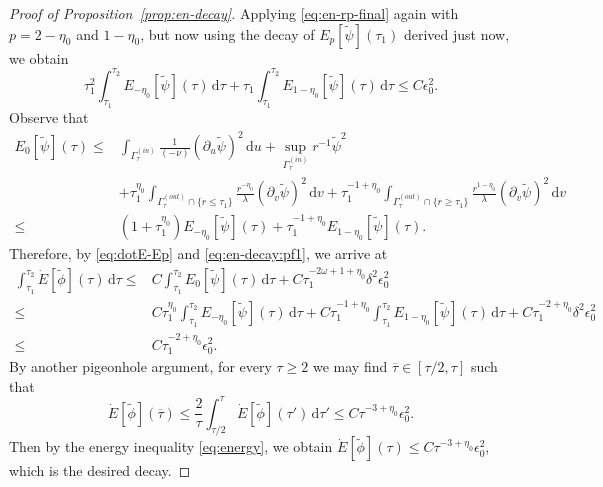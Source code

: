 \documentclass[10pt, reqno]{amsart}
\theoremstyle{definition}
\theoremstyle{remark}
\theoremstyle{conjecture}
\numberwithin{equation}{section}
\newcommand{\set}[1]{\{#1\}}
\newcommand{\ud}{\mathrm{d}}
\newcommand{\rd}{\partial}
\newcommand{\0}{\emptyset}
\newcommand{\Gmm}{\Gamma}
\newcommand{\dlt}{\delta}
\newcommand{\eps}{\epsilon}
\newcommand{\lmb}{\lambda}
\newcommand{\omg}{\omega}
\newcommand{\dur}{\nu}
\newcommand{\dvr}{\lmb}
\newcommand{\phibg}{\overline{\phi}}				%
\newcommand{\psibg}{\overline{\psi}}				%
\newcommand{\phidf}{\widetilde{\phi}}				%
\newcommand{\psidf}{\widetilde{\psi}}				%
\begin{document}
\begin{proof}[Proof of Proposition~\ref{prop:en-decay}]
Applying \eqref{eq:en-rp-final} again with $p = 2-\eta_{0}$ and $1-\eta_{0}$, but now using the decay of $E_{p}[\psidf](\tau_{1})$ derived just now, we obtain
\begin{equation} \label{eq:en-decay:pf1}
	\tau_{1}^{2} \int_{\tau_{1}}^{\tau_{2}} E_{-\eta_{0}}[\psidf](\tau) \, \ud \tau 
	+ \tau_{1} \int_{\tau_{1}}^{\tau_{2}} E_{1-\eta_{0}}[\psidf](\tau) \, \ud \tau \leq C \eps_{0}^{2}. 
\end{equation}
Observe that
\begin{align*}
	E_{0}[\psidf](\tau)
	\leq & \int_{\Gmm^{(in)}_{\tau}} \frac{1}{(-\dur)} (\rd_{u} \psidf)^{2} \, \ud u
	+ \sup_{\Gmm^{(in)}_{\tau}} r^{-1} \psidf^{2} \\
	& + \tau_{1}^{\eta_{0}} \int_{\Gmm^{(out)}_{\tau} \cap \set{r \leq \tau_{1}}} \frac{r^{-\eta_{0}}}{\dvr} (\rd_{v} \psidf)^{2} \, \ud v
	+ \tau_{1}^{-1+\eta_{0}}\int_{\Gmm^{(out)}_{\tau} \cap \set{r \geq \tau_{1}}} \frac{r^{1-\eta_{0}}}{\dvr} (\rd_{v} \psidf)^{2} \, \ud v \\
	\leq & (1 + \tau_{1}^{\eta_{0}}) E_{-\eta_{0}}[\psidf](\tau) + \tau_{1}^{-1+\eta_{0}} E_{1-\eta_{0}}[\psidf](\tau).
\end{align*}
Therefore, by \eqref{eq:dotE-Ep} and \eqref{eq:en-decay:pf1}, we arrive at
\begin{align*}
	\int_{\tau_{1}}^{\tau_{2}} \dot{E}[\phidf](\tau) \, \ud \tau
	\leq & C \int_{\tau_{1}}^{\tau_{2}} E_{0}[\psidf](\tau) \, \ud \tau + C \tau_{1}^{-2 \omg + 1 + \eta_{0}} \dlt^{2} \eps_{0}^{2} \\
	\leq & C \tau_{1}^{\eta_{0}} \int_{\tau_{1}}^{\tau_{2}} E_{-\eta_{0}}[\psidf](\tau) \, \ud \tau 
	+ C \tau_{1}^{-1+\eta_{0}} \int_{\tau_{1}}^{\tau_{2}} E_{1-\eta_{0}}[\psidf](\tau) \, \ud \tau 
	+ C \tau_{1}^{-2 + \eta_{0}} \dlt^{2} \eps_{0}^{2} \\	
	\leq & C \tau_{1}^{-2+\eta_{0}} \eps_{0}^{2}.
\end{align*}
By another pigeonhole argument, for every $\tau \geq 2$ we may find $\overline{\tau} \in [\tau/2, \tau]$ such that
\begin{equation*}
	\dot{E}[\phidf](\overline{\tau})
	\leq \frac{2}{\tau} \int_{\tau/2}^{\tau} \dot{E} [\phidf] (\tau') \, \ud \tau'
	\leq C \tau^{-3 + \eta_{0}} \eps_{0}^{2}.
\end{equation*}
Then by the energy inequality \eqref{eq:energy}, we obtain $\dot{E}[\phidf] (\tau) \leq C \tau^{-3+\eta_{0}} \eps_{0}^{2}$, which is the desired decay. \qedhere
\end{proof}
\end{document}
